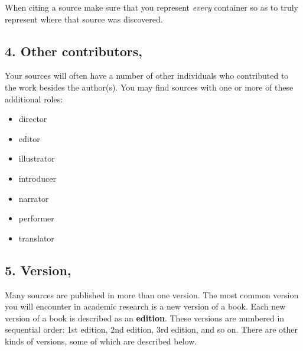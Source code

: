  \bigskip

\noindent When citing a source make sure that you represent \emph{every} container so as to truly represent where that source was discovered. 

\subsection{4. Other contributors,}

Your sources will often have a number of other individuals who contributed to the work besides the author(s). You may find sources with one or more of these additional roles:

\begin{itemize}

\item director
\item editor
\item illustrator
\item introducer
\item narrator
\item performer
\item translator
\end{itemize}

 \bigskip

 \bigskip



\subsection{5. Version,}

Many sources are published in more than one version. The most common version you will encounter in academic research is a new version of a book. Each new version of a book is described as an \textbf{edition}. These versions are numbered in sequential order: 1st edition, 2nd edition, 3rd edition, and so on. There are other kinds of versions, some of which are described below. 

\bigskip 

 \bigskip

